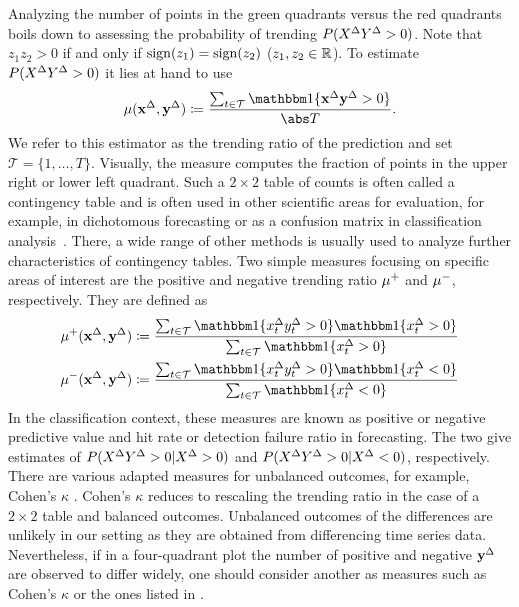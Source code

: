 Analyzing the number of points in the green quadrants versus the red quadrants boils down to assessing the probability of trending $P(X^{\Delta} Y^{\Delta} > 0)$.
Note that $z_1 z_2 > 0$ if and only if $\operatorname{sign}(z_1) = \operatorname{sign}(z_2)$ ($z_1, z_2 \in \mathbb{R}$).
To estimate $P(X^{\Delta} Y^{\Delta} > 0)$ it lies at hand to use
\begin{equation}
    \acc (\diffx, \diffy) \coloneqq \frac{\sum_{t \in \mathcal{T}} \ind{\diffx \diffy > 0}}{\card{T}}.\label{eq:acc}
\end{equation}
We refer to this estimator as the trending ratio of the prediction and set $\mathcal{T} = \{1, \dots, T\}$.
Visually, the measure computes the fraction of points in the upper right or lower left quadrant.
Such a $2 \times 2$ table of counts is often called a contingency table and is often used in other scientific areas for evaluation, for example, in dichotomous forecasting or as a confusion matrix in classification analysis~\parencites(see, e.g., the introductions in)()[Ch. 4]{James2021}[Ch. 3]{Jolliffe2012}.
There, a wide range of other methods is usually used to analyze further characteristics of contingency tables.
Two simple measures focusing on specific areas of interest are the positive and negative trending ratio $\mu^+$ and $\mu^-$, respectively.
They are defined as
\begin{align}
    \accp (\diffx, \diffy) &\coloneqq \frac{\sum_{t \in \mathcal{T}} \ind{\diffxt \diffyt > 0} \ind{\diffxt > 0}}{\sum_{t \in \mathcal{T}} \ind{\diffxt > 0}} \label{eq:accp}\\
    \accm (\diffx, \diffy) &\coloneqq \frac{\sum_{t \in \mathcal{T}} \ind{\diffxt \diffyt > 0} \ind{\diffxt < 0}}{\sum_{t \in \mathcal{T}} \ind{\diffxt < 0}}\label{eq:accm}
\end{align}
In the classification context, these measures are known as positive or negative predictive value and hit rate or detection failure ratio in forecasting.
The two give estimates of $P(X^{\Delta} Y^{\Delta} > 0 | X^{\Delta} > 0)$ and $P(X^{\Delta} Y^{\Delta} > 0 | X^{\Delta} < 0)$, respectively.
There are various adapted measures for unbalanced outcomes, for example, Cohen's $\kappa$ .
Cohen's $\kappa$ reduces to rescaling the trending ratio in the case of a $2\times2$ table and balanced outcomes.
Unbalanced outcomes of the differences are unlikely in our setting as they are obtained from differencing time series data.
Nevertheless, if in a four-quadrant plot the number of positive and negative $\mathbf{y}^{\Delta}$ are observed to differ widely, one should consider another as measures such as Cohen's $\kappa$ or the ones listed in \textcite[Table 3.3]{Jolliffe2012}.

